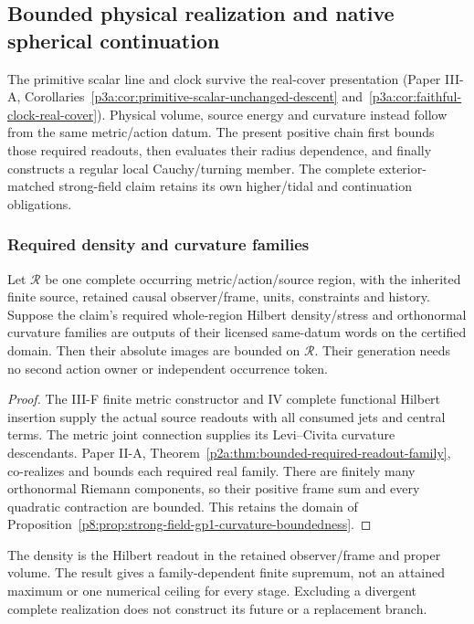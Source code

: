 \documentclass[12pt,a4paper]{article}
\begin{document}
\subsection{Bounded physical realization and native spherical continuation}
\label{p8:sec:bounded-spherical-continuation}

The primitive scalar line and clock survive the real-cover presentation
(Paper III-A, Corollaries~\ref{p3a:cor:primitive-scalar-unchanged-descent}
and~\ref{p3a:cor:faithful-clock-real-cover}). Physical volume, source energy
and curvature instead follow from the same metric/action datum. The present
positive chain first bounds those required readouts, then evaluates their
radius dependence, and finally constructs a regular local Cauchy/turning
member. The complete exterior-matched strong-field claim retains its own
higher/tidal and continuation obligations.

\subsubsection{Required density and curvature families}
\begin{theorem}
\label{p8:thm:bounded-faithful-metric-realization}
Let \(\mathcal R\) be one complete occurring metric/action/source region,
with the inherited finite source, retained causal observer/frame, units,
constraints and history. Suppose the claim's required whole-region Hilbert
density/stress and orthonormal curvature families are outputs of their
licensed same-datum words on the certified domain. Then their absolute
images are bounded on \(\mathcal R\). Their generation needs no second
action owner or independent occurrence token.
\end{theorem}
\begin{proof}
The III-F finite metric constructor and IV complete functional Hilbert
insertion supply the actual source readouts with all consumed jets and central
terms. The metric joint connection supplies its Levi--Civita curvature
descendants. Paper II-A,
Theorem~\ref{p2a:thm:bounded-required-readout-family}, co-realizes and bounds
each required real family. There are finitely many orthonormal Riemann
components, so their positive frame sum and every quadratic contraction
are bounded. This retains the domain of
Proposition~\ref{p8:prop:strong-field-gp1-curvature-boundedness}.
\end{proof}
The density is the Hilbert readout in the retained observer/frame and proper
volume. The result gives a family-dependent finite supremum, not an attained
maximum or one numerical ceiling for every stage. Excluding a divergent
complete realization does not construct its future or a replacement branch.
\end{document}
